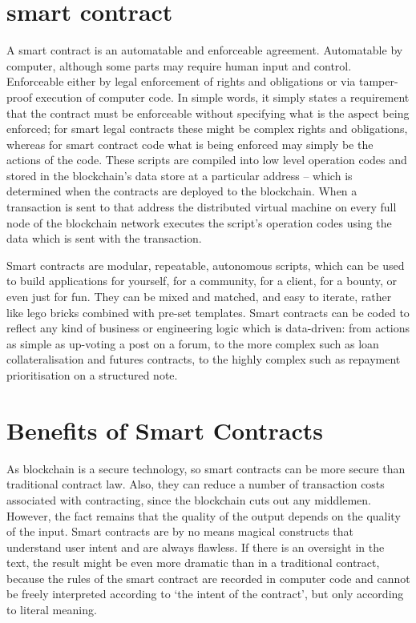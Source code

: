 \section{smart contract}
A smart contract is an automatable and enforceable agreement. Automatable by computer, although some parts may require human input and control. Enforceable either by legal enforcement of rights and obligations or via tamper-proof execution of computer code.\cite{Clack2016SmartDirections}
In simple words, it simply states a requirement that the contract must be enforceable without specifying what is the aspect being enforced; for smart legal contracts these might be complex rights and obligations, whereas for smart contract code what is being enforced may simply be the actions of the code.
These scripts are compiled into low level operation codes and stored in the blockchain’s data store at a particular address – which is determined when the contracts are deployed to the blockchain. When a transaction is sent to that address the distributed virtual machine on every full node of the blockchain network executes the script’s operation codes using the data which is sent with the transaction. \cite{MonaxContracts}

Smart contracts are modular, repeatable, autonomous scripts, which can be used to build applications for yourself, for a community, for a client, for a bounty, or even just for fun. They can be mixed and matched, and easy to iterate, rather like lego bricks combined with pre-set templates.
Smart contracts can be coded to reflect any kind of business or engineering logic which is data-driven: from actions as simple as up-voting a post on a forum, to the more complex such as loan collateralisation and futures contracts, to the highly complex such as repayment prioritisation on a structured note.

\section{Benefits of Smart Contracts}
As blockchain is a secure technology, so smart contracts can be more secure than traditional contract law. Also, they can reduce a number of transaction costs associated with contracting, since the blockchain cuts out any middlemen. However, the fact remains that the quality of the output depends on the quality of the input. Smart contracts are by no means magical constructs that understand user intent and are always flawless. If there is an oversight in the text, the result might be even more dramatic than in a traditional contract, because the rules of the smart contract are recorded in computer code and cannot be freely interpreted according to ‘the intent of the contract’, but only according to literal meaning.

